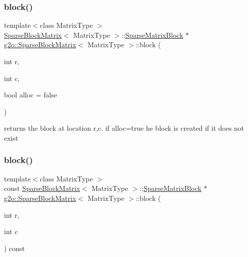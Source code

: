 \subsubsection{\texorpdfstring{block()}{block()}\hspace{0.1cm}{\footnotesize\ttfamily [1/2]}}
{\footnotesize\ttfamily template$<$class Matrix\+Type $>$ \\
\mbox{\hyperlink{classg2o_1_1_sparse_block_matrix}{Sparse\+Block\+Matrix}}$<$ Matrix\+Type $>$\+::\mbox{\hyperlink{classg2o_1_1_sparse_block_matrix_ab2f7376cbf055803fda6527dcc43e3be}{Sparse\+Matrix\+Block}} $\ast$ \mbox{\hyperlink{classg2o_1_1_sparse_block_matrix}{g2o\+::\+Sparse\+Block\+Matrix}}$<$ Matrix\+Type $>$\+::block (\begin{DoxyParamCaption}\item[{int}]{r,  }\item[{int}]{c,  }\item[{bool}]{alloc = {\ttfamily false} }\end{DoxyParamCaption})}



returns the block at location r,c. if alloc=true he block is created if it does not exist 

\mbox{\label{classg2o_1_1_sparse_block_matrix_aa8268815dbc660a4aa04c4360e3e9e2c}} 
\subsubsection{\texorpdfstring{block()}{block()}\hspace{0.1cm}{\footnotesize\ttfamily [2/2]}}
{\footnotesize\ttfamily template$<$class Matrix\+Type $>$ \\
const \mbox{\hyperlink{classg2o_1_1_sparse_block_matrix}{Sparse\+Block\+Matrix}}$<$ Matrix\+Type $>$\+::\mbox{\hyperlink{classg2o_1_1_sparse_block_matrix_ab2f7376cbf055803fda6527dcc43e3be}{Sparse\+Matrix\+Block}} $\ast$ \mbox{\hyperlink{classg2o_1_1_sparse_block_matrix}{g2o\+::\+Sparse\+Block\+Matrix}}$<$ Matrix\+Type $>$\+::block (\begin{DoxyParamCaption}\item[{int}]{r,  }\item[{int}]{c }\end{DoxyParamCaption}) const}



